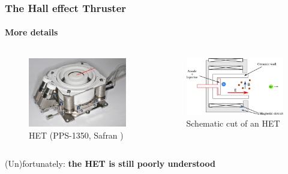 \documentclass[sans, aspectratio=169]{beamer}
\begin{document}
\begin{frame} 
	\frametitle{The Hall effect Thruster} 
	\framesubtitle{More details} 

\begin{columns}

	\begin{column}{0.45\linewidth}
		\begin{figure}[hbtp]
		\centering
		\includegraphics[scale=0.25]{images/PPS1350-G.png}
		\caption{HET (PPS-1350, Safran )}
		\end{figure}
	
	\end{column}

	\begin{column}{0.45\linewidth}
		\begin{figure}[hbtp]
		\centering
		\includegraphics[scale=0.7]{images/HET.png}
		\caption{Schematic cut of an HET}
		\end{figure}
	
	\end{column}

\end{columns}	
\pause
\begin{center}
	(Un)fortunately: \textbf{the HET is still poorly understood}

\end{center}
\end{frame}
\end{document}
